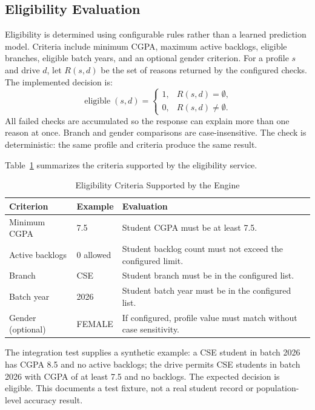 \documentclass[conference,final]{IEEEtran}
\begin{document}
\subsection{Eligibility Evaluation}
Eligibility is determined using configurable rules rather than a learned prediction model. Criteria include minimum CGPA, maximum active backlogs, eligible branches, eligible batch years, and an optional gender criterion. For a profile $s$ and drive $d$, let $R(s,d)$ be the set of reasons returned by the configured checks. The implemented decision is:
\begin{equation}
    \operatorname{eligible}(s,d) = \begin{cases}
        1, & R(s,d)=\emptyset,\\
        0, & R(s,d)\ne\emptyset.
    \end{cases}
\end{equation}
All failed checks are accumulated so the response can explain more than one reason at once. Branch and gender comparisons are case-insensitive. The check is deterministic: the same profile and criteria produce the same result.

Table~\ref{tab:criteria} summarizes the criteria supported by the eligibility service.

\begin{table}[!t]
\caption{Eligibility Criteria Supported by the Engine}
\label{tab:criteria}
\centering
\footnotesize
\begin{tabular}{|p{}|p{}|p{}|}
\hline
\textbf{Criterion} & \textbf{Example} & \textbf{Evaluation} \\
\hline
Minimum CGPA & 7.5 & Student CGPA must be at least 7.5. \\
\hline
Active backlogs & 0 allowed & Student backlog count must not exceed the configured limit. \\
\hline
Branch & CSE & Student branch must be in the configured list. \\
\hline
Batch year & 2026 & Student batch year must be in the configured list. \\
\hline
Gender (optional) & FEMALE & If configured, profile value must match without case sensitivity. \\
\hline
\end{tabular}
\end{table}

The integration test supplies a synthetic example: a CSE student in batch 2026 has CGPA 8.5 and no active backlogs; the drive permits CSE students in batch 2026 with CGPA of at least 7.5 and no backlogs. The expected decision is eligible. This documents a test fixture, not a real student record or population-level accuracy result.
\end{document}
